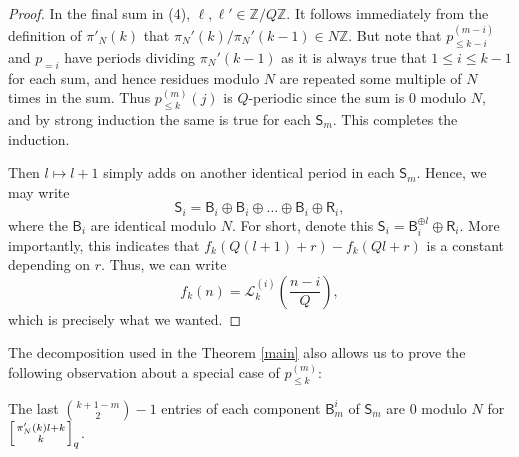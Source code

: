 \documentclass[12pt]{article}
\newcommand{\Z}{\mathbb{Z}}
\newcommand{\qbinom}[2]{\left[{#1 \atop #2}\right]_q}
\begin{document}
\begin{proof}
In the final sum in (4), $\ell, \ell' \in \Z/Q\Z$. It follows immediately from the definition of $\pi'_N(k)$ that $\pi_{N}'(k)/\pi_{N}'(k-1) \in N\mathbb{Z}$. But note that $p_{\le k-i}^{(m-i)}$ and $p_{=i}$ have periods dividing $\pi_{N}'(k-1)$ as it is always true that $1\le i\le k-1$ for each sum, and hence residues modulo $N$ are repeated some multiple of $N$ times in the sum. Thus $p_{\le k}^{(m)}(j)$ is $Q$-periodic since the sum is $0$ modulo $N$, and by strong induction the same is true for each $\mathsf{S}_m$. This completes the induction.

Then $l \mapsto l+1$ simply adds on another identical period in each $\mathsf{S}_m$. Hence, we may write
\[\mathsf{S}_i = \mathsf{B}_i \oplus \mathsf{B}_i \oplus \ldots \oplus \mathsf{B}_i \oplus \mathsf{R}_i,\]
where the $\mathsf{B}_i$ are identical modulo $N$. For short, denote this $\mathsf{S}_i = \mathsf{B}_i^{\oplus l}\oplus\mathsf{R}_i$. More importantly, this indicates that  $f_{k}(Q(l+1)+r)-f_{k}(Ql+r)$ is a constant depending on $r$. Thus, we can write
\[f_{k}(n)=\mathcal{L}_{k}^{(i)}\left(\frac{n-i}{Q}\right),\]
which is precisely what we wanted.
\end{proof}


The decomposition used in the Theorem \ref{main} also allows us to prove the following observation about a special case of $p_{\le k}^{(m)}$:

\begin{corollary}
The last $\binom{k+1-m}{2}-1$ entries of each component $\mathsf{B}_m^i$ of $\mathsf{S}_m$ are $0$ modulo $N$ for $\qbinom{\pi'_N(k)l+k}{k}$. 
\end{corollary}
\end{document}
